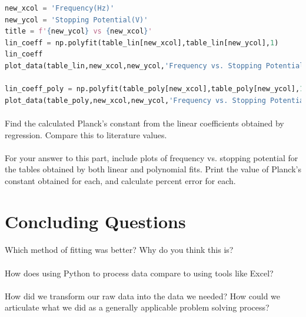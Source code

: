 \documentclass{journal}
\begin{document}
\begin{lstlisting}[language=python]
new_xcol = 'Frequency(Hz)'
new_ycol = 'Stopping Potential(V)' 
title = f'{new_ycol} vs {new_xcol}'
lin_coeff = np.polyfit(table_lin[new_xcol],table_lin[new_ycol],1)
lin_coeff
plot_data(table_lin,new_xcol,new_ycol,'Frequency vs. Stopping Potential',lin_coeff,output_file='PlanckRegression.png')

lin_coeff_poly = np.polyfit(table_poly[new_xcol],table_poly[new_ycol],1)
plot_data(table_poly,new_xcol,new_ycol,'Frequency vs. Stopping Potential',lin_coeff_poly,output_file='PlanckRegression.png')
\end{lstlisting}
\paragraph{}
Find the calculated Planck's constant from the linear coefficients obtained by regression. Compare this to literature values.
\paragraph{}
For your answer to this part, include plots of frequency vs. stopping potential for the tables obtained by both linear and polynomial fits. Print the value of Planck's constant obtained for each, and calculate percent error for each.

\section*{Concluding Questions}
\paragraph{}
Which method of fitting was better? Why do you think this is?
\paragraph{}
How does using Python to process data compare to using tools like Excel?
\paragraph{}
How did we transform our raw data into the data we needed? How could we articulate what we did as a generally applicable problem solving process?
\end{document}
